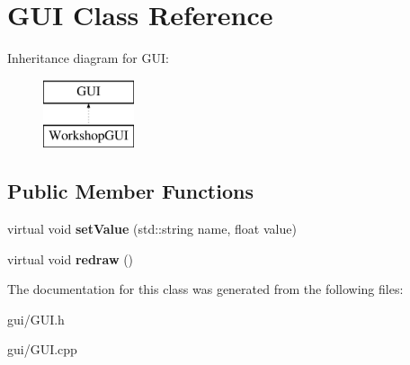 \hypertarget{classGUI}{}\section{G\+UI Class Reference}
\label{classGUI}
Inheritance diagram for G\+UI\+:\begin{figure}[H]
\begin{center}
\leavevmode
\includegraphics[height=2.000000cm]{classGUI}
\end{center}
\end{figure}
\subsection*{Public Member Functions}
\begin{DoxyCompactItemize}
\item 
virtual void {\bfseries set\+Value} (std\+::string name, float value)\hypertarget{classGUI_ac7565b952201756e1dc1f0b9486f6b28}{}\label{classGUI_ac7565b952201756e1dc1f0b9486f6b28}

\item 
virtual void {\bfseries redraw} ()\hypertarget{classGUI_a86c7f4b8bd81b4c0e191b40a134e2f9e}{}\label{classGUI_a86c7f4b8bd81b4c0e191b40a134e2f9e}

\end{DoxyCompactItemize}


The documentation for this class was generated from the following files\+:\begin{DoxyCompactItemize}
\item 
gui/G\+U\+I.\+h\item 
gui/G\+U\+I.\+cpp\end{DoxyCompactItemize}
